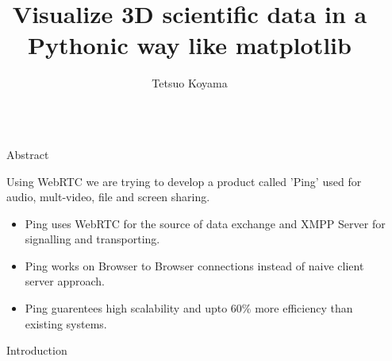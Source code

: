 \documentclass[final]{beamer}
\title{Visualize 3D scientific data in a Pythonic way like matplotlib} %
\author{Tetsuo Koyama} %
\institute{PyVista developers team} %
\newlength{\sepwid}
\newlength{\onecolwid}
\begin{document}

\setlength{\belowcaptionskip}{2ex} %
\setlength\belowdisplayshortskip{2ex} %

\begin{frame}[t] %

\begin{columns}[t] %

\begin{column}{\sepwid}\end{column} %

\begin{column}{\onecolwid} %


\begin{alertblock}{Abstract}

Using WebRTC we are trying to develop a product called 'Ping' used for audio, mult-video, file and screen sharing.
\begin{itemize}
\item Ping uses WebRTC for the source of data exchange and XMPP Server for signalling and transporting.
\item Ping works on Browser to Browser connections instead of naive client server approach.
\item Ping guarentees high scalability and upto 60\% more efficiency than existing systems.
\end{itemize}

\end{alertblock}


\begin{block}{Introduction}


\end{block}
\end{column}
\end{columns}
\end{frame}
\end{document}
